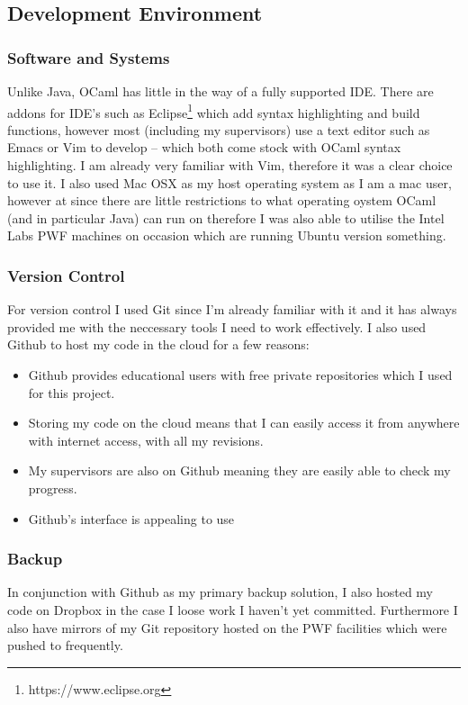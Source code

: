 \documentclass[12pt,twoside,notitlepage]{report}
\begin{document}
\subsection{Development Environment}
\label{subsec:development_environment}

\subsubsection{Software and Systems}
Unlike Java, OCaml has little in the way of a fully supported IDE. There are addons for IDE's such as Eclipse\footnote{https://www.eclipse.org} which add syntax highlighting and build functions, however most (including my supervisors)
use a text editor such as Emacs or Vim to develop -- which both come stock with OCaml syntax highlighting. I am already very familiar with Vim, therefore it was a clear choice to use it. I also used Mac OSX as my host operating system
as I am a mac user, however at since there are little restrictions to what operating oystem OCaml (and in particular Java) can run on therefore I was also able to utilise the Intel Labs PWF machines on occasion which are running
Ubuntu version something.

\subsubsection{Version Control}
For version control I used Git since I'm already familiar with it and it has always provided me with the neccessary tools I need to work effectively. I also used Github to host my code in the cloud for a few reasons:

\begin{itemize}
\item Github provides educational users with free private repositories which I used for this project.
\item Storing my code on the cloud means that I can easily access it from anywhere with internet access, with all my revisions.
\item My supervisors are also on Github meaning they are easily able to check my progress.
\item Github's interface is appealing to use 
\end{itemize}

\subsubsection{Backup}
In conjunction with Github as my primary backup solution, I also hosted my code on Dropbox in the case I loose work I haven't yet committed. Furthermore I also have mirrors of my Git repository hosted on the PWF facilities which were pushed to
frequently.
\end{document}
